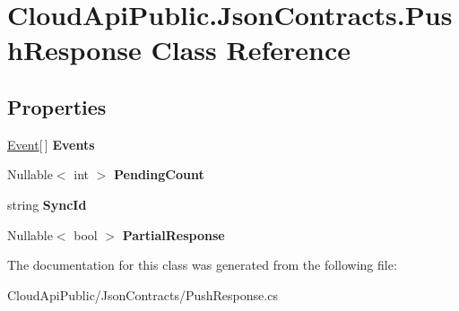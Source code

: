 \hypertarget{class_cloud_api_public_1_1_json_contracts_1_1_push_response}{\section{Cloud\-Api\-Public.\-Json\-Contracts.\-Push\-Response Class Reference}
\label{class_cloud_api_public_1_1_json_contracts_1_1_push_response}
}
\subsection*{Properties}
\begin{DoxyCompactItemize}
\item 
\hypertarget{class_cloud_api_public_1_1_json_contracts_1_1_push_response_a18289ecf6e91a58d570a932f6ab03681}{\hyperlink{class_cloud_api_public_1_1_json_contracts_1_1_event}{Event}\mbox{[}$\,$\mbox{]} {\bfseries Events}}\label{class_cloud_api_public_1_1_json_contracts_1_1_push_response_a18289ecf6e91a58d570a932f6ab03681}

\item 
\hypertarget{class_cloud_api_public_1_1_json_contracts_1_1_push_response_af3d334af4755bd8b6e3a68b0a8a2819e}{Nullable$<$ int $>$ {\bfseries Pending\-Count}}\label{class_cloud_api_public_1_1_json_contracts_1_1_push_response_af3d334af4755bd8b6e3a68b0a8a2819e}

\item 
\hypertarget{class_cloud_api_public_1_1_json_contracts_1_1_push_response_af5349e965a50b4604b1095a6d8a734aa}{string {\bfseries Sync\-Id}}\label{class_cloud_api_public_1_1_json_contracts_1_1_push_response_af5349e965a50b4604b1095a6d8a734aa}

\item 
\hypertarget{class_cloud_api_public_1_1_json_contracts_1_1_push_response_abc07ebca90864beaf36d4c39a626976b}{Nullable$<$ bool $>$ {\bfseries Partial\-Response}}\label{class_cloud_api_public_1_1_json_contracts_1_1_push_response_abc07ebca90864beaf36d4c39a626976b}

\end{DoxyCompactItemize}


The documentation for this class was generated from the following file\-:\begin{DoxyCompactItemize}
\item 
Cloud\-Api\-Public/\-Json\-Contracts/Push\-Response.\-cs\end{DoxyCompactItemize}
